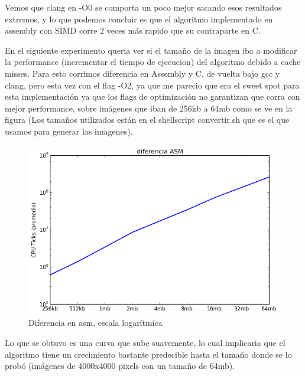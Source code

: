\documentclass[a4paper]{article}
\begin{document}
\noindent Vemos que clang en -O0 se comporta un poco mejor sacando esos resultados extremos, y lo que podemos concluir es que el algoritmo implementado en assembly con SIMD corre 2 veces más rapido que su contraparte en C.

\newpage 

\noindent En el siguiente experimento queria ver si el tamaño de la imagen iba a modificar la performance (incrementar el tiempo de ejecucion) del algoritmo debido a cache misses. Para esto corrimos diferencia en Assembly y C, de vuelta bajo gcc y clang, pero esta vez con el flag -O2, ya que me parecio que era el sweet spot para esta implementación ya que los flags de optimización no garantizan que corra con mejor performance, sobre imágenes que iban de 256kb a 64mb como se ve en la figura (Los tamaños utilizados están en el shellscript convertir.sh que es el que usamos para generar las imagenes). 

\begin{figure}[h]
	\includegraphics[scale=0.60]{imagenes/test_performance_size_ASM.png}
	\caption{Diferencia en asm, escala logarítmica}
\end{figure}

\noindent Lo que se obtuvo es una curva que sube suavemente, lo cual implicaria que el algoritmo tiene un crecimiento bastante predecible hasta el tamaño donde se lo probó (imágenes de 4000x4000 pixels con un tamaño de 64mb).
\end{document}
